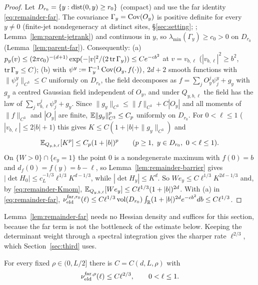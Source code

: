 \begin{proof}
Let $D_{r_0}=\{y:\operatorname{dist}(0,y)\ge r_0\}$ (compact) and use the far identity \eqref{eq:remainder-far}. The covariance $\Gamma_y=\operatorname{Cov}(O_y)$ is positive definite for every $y\ne0$ (finite-jet nondegeneracy at distinct sites, \S\ref{sec:setting}; \cite[\S2]{parentP}; Lemma~\ref{lem:parent-jetrank}) and continuous in $y$, so $\lambda_{\min}(\Gamma_y)\ge c_0>0$ on $D_{r_0}$ \cite[\S14]{parentP} (Lemma~\ref{lem:parent-far}). Consequently:
(a) $p_y(v)\le(2\pi c_0)^{-(d+1)}\exp(-|v|^2/(2\operatorname{tr}\Gamma_y))\le Ce^{-cb^2}$ at $v=v_{b,\ell}$ ($|v_{b,\ell}|^2\ge b^2$, $\operatorname{tr}\Gamma_y\le C$);
(b) with $\psi^y:=\Gamma_y^{-1}\operatorname{Cov}(O_y,f(\cdot))$, $2d+2$ smooth functions with $\|\psi^y_j\|_{C^3}\le C$ uniformly on $D_{r_0}$, the field decomposes as $f=\sum_jO_y^j\psi^y_j+g_y$ with $g_y$ a centred Gaussian field independent of $O_y$, and under $Q_{y,b,\ell}$ the field has the law of $\sum_jv_{b,\ell}^j\psi^y_j+g_y$. Since $\|g_y\|_{C^3}\le\|f\|_{C^3}+C|O_y|$ and all moments of $\|f\|_{C^3}$ and $|O_y|$ are finite, $\mathbb E\|g_y\|_{C^3}^p\le C_p$ uniformly on $D_{r_0}$. For $0<\ell\le1$ ($|v_{b,\ell}|\le2|b|+1$) this gives $K\le C(1+|b|+\|g_y\|_{C^3})$ and
\begin{equation}\label{eq:remainder-Kmom}
\E_{Q_{y,b,\ell}}[K^p]\le C_p(1+|b|)^p\qquad(p\ge1,\ y\in D_{r_0},\ 0<\ell\le1).
\end{equation}
On $\{W>0\}\cap\{e_y=1\}$ the point $0$ is a nondegenerate maximum with $f(0)=b$ and $d_f(0)=f(y)=b-\ell$, so Lemma~\ref{lem:remainder-barrier} gives $|\det H_0|\le c_L^{-1/3}\ell^{1/3}K^{d-1/3}$, while $|\det H_y|\le K^d$. So $We_y\le C\ell^{1/3}K^{2d-1/3}$ and, by \eqref{eq:remainder-Kmom}, $\mathbb E_{Q_{y,b,\ell}}[We_y]\le C\ell^{1/3}(1+|b|)^{2d}$. With (a) in \eqref{eq:remainder-far}, $\nu_{\mathrm{eld}}^{\mathrm{far},r_0}(\ell)\le C\ell^{1/3}\operatorname{vol}(D_{r_0})\int_\mathbb R(1+|b|)^{2d}e^{-cb^2}db\le C\ell^{1/3}$.
\end{proof}

Lemma~\ref{lem:remainder-far} needs no Hessian density and suffices for this section, because the far term is not the bottleneck of the estimate below. Keeping the determinant weight through a spectral integration gives the sharper rate $\ell^{2/3}$, which Section~\ref{sec:third} uses.

\begin{proposition}\label{prop:remainder-farrate}
For every fixed $\rho\in(0,L/2]$ there is $C=C(d,L,\rho)$ with
\begin{equation}\label{eq:remainder-farrate}
\nu_{\mathrm{eld}}^{\mathrm{far},\rho}(\ell)\le C\ell^{2/3},\qquad0<\ell\le1 .
\end{equation}
\end{proposition}

